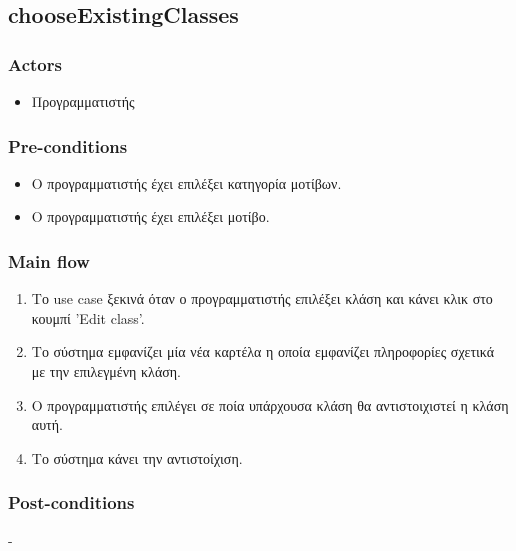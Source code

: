 \documentclass[../diploma_thesis.tex]{subfiles}
\begin{document}
\subsection{chooseExistingClasses}
\subsubsection{Actors}
\begin{itemize}
\item  Προγραμματιστής
\end{itemize}
\subsubsection{Pre-conditions}
\begin{itemize}
\item Ο προγραμματιστής έχει επιλέξει κατηγορία μοτίβων.
\item  Ο προγραμματιστής έχει επιλέξει μοτίβο.
\end{itemize}
\subsubsection{Main flow}
\begin{enumerate}
\item Το use case ξεκινά όταν ο προγραμματιστής επιλέξει κλάση και κάνει κλικ στο κουμπί 'Edit class'.
\item Το σύστημα εμφανίζει μία νέα καρτέλα η οποία εμφανίζει πληροφορίες σχετικά με την επιλεγμένη κλάση.
\item Ο προγραμματιστής επιλέγει σε ποία υπάρχουσα κλάση θα αντιστοιχιστεί η κλάση αυτή.
\item Το σύστημα κάνει την αντιστοίχιση.
\end{enumerate}
\subsubsection{Post-conditions}
-
\end{document}
